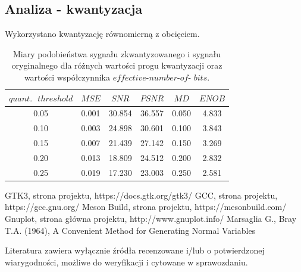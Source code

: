\documentclass{article}
\begin{document}
\subsection{Analiza - kwantyzacja}
Wykorzystano kwantyzację równomierną z obcięciem.
\begin{table}[H]
\centering
\begin{tabular}{|c | c | c | c | c | c|}
 \hline
 $quant.\text{ }threshold$ & $MSE$ & $SNR$ & $PSNR$ & $MD$ & $ENOB$\\
 \hline
 0.05 & 0.001 & 30.854 & 36.557 & 0.050 & 4.833 \\
 \hline
 0.10 & 0.003 & 24.898 & 30.601 & 0.100 & 3.843 \\
 \hline
 0.15 & 0.007 & 21.439 & 27.142 & 0.150 & 3.269 \\
 \hline
 0.20 & 0.013 & 18.809 & 24.512 & 0.200 & 2.832 \\
 \hline
 0.25 & 0.019 & 17.230 & 23.003 & 0.250 & 2.581 \\
 \hline
\end{tabular}
\caption{Miary podobieństwa sygnału zkwantyzowanego i sygnału oryginalnego dla różnych wartości progu kwantyzacji oraz wartości współczynnika $effective$-$number$-$of$- $bits$. }
\label{table:quant}
\end{table}

\begin{thebibliography}{0}
 GTK3, strona projektu, https://docs.gtk.org/gtk3/
 GCC, strona projektu, https://gcc.gnu.org/  
 Meson Build, strona projektu, https://mesonbuild.com/
 Gnuplot, strona główna projektu, http://www.gnuplot.info/
 Marsaglia G., Bray T.A. (1964), A Convenient Method for Generating Normal Variables
\end{thebibliography}

Literatura zawiera wyłącznie źródła recenzowane i/lub o potwierdzonej wiarygodności,
możliwe do weryfikacji i cytowane w sprawozdaniu. 
\end{document}
